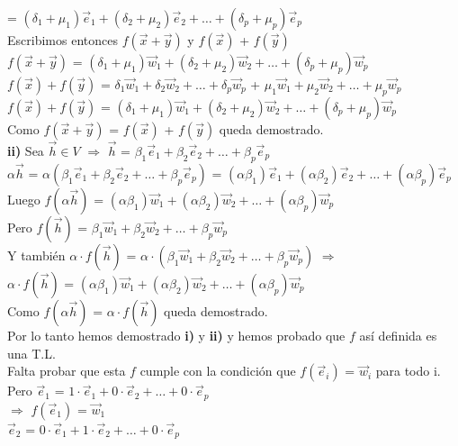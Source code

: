 \documentclass[11pt]{article}
\begin{document}
= $(\delta_1 + \mu_1)\vec{e}_1 + (\delta_2 + \mu_2) \vec{e}_2 + \hdots + (\delta_p + \mu_p) \vec{e}_p$\\
Escribimos entonces $f(\vec{x} + \vec{y})$ y $f(\vec{x})$ + $f(\vec{y})$\\
$f(\vec{x} + \vec{y})$ = $(\delta_1 + \mu_1)\vec{w}_1 + (\delta_2 + \mu_2) \vec{w}_2 + \hdots + (\delta_p + \mu_p) \vec{w}_p$ \\
$f(\vec{x}) + f(\vec{y})$ = $\delta_1\vec{w}_1 + \delta_2 \vec{w}_2 + \hdots + \delta_p \vec{w}_p$ + $\mu_1\vec{w}_1 + \mu_2 \vec{w}_2 + \hdots + \mu_p \vec{w}_p$\\
$f(\vec{x}) + f(\vec{y})$ = $(\delta_1 + \mu_1)\vec{w}_1 + (\delta_2 + \mu_2) \vec{w}_2 + \hdots + (\delta_p + \mu_p) \vec{w}_p$\\
Como $f(\vec{x} + \vec{y})$ = $f(\vec{x})$ + $f(\vec{y})$ queda demostrado.\\
{\bfseries ii)} Sea $\vec{h} \in V$ $\Rightarrow$ $\vec{h}$ = $\beta_1\vec{e}_1 + \beta_2 \vec{e}_2 + \hdots + \beta_p\vec{e}_p$ \\
$\alpha \vec{h}$ = $\alpha(\beta_1\vec{e}_1 + \beta_2 \vec{e}_2 + \hdots + \beta_p\vec{e}_p)$ = $(\alpha \beta_1)\vec{e}_1 + (\alpha \beta_2)\vec{e}_2 + \hdots + (\alpha \beta_p)\vec{e}_p$ \\
Luego $f(\alpha \vec{h})$ = $(\alpha \beta_1)\vec{w}_1 + (\alpha \beta_2)\vec{w}_2 + \hdots + (\alpha \beta_p)\vec{w}_p$ \\
Pero $f(\vec{h})$ = $\beta_1\vec{w}_1 + \beta_2 \vec{w}_2 + \hdots + \beta_p\vec{w}_p$\\
Y también $\alpha \cdot f(\vec{h})$ = $\alpha \cdot (\beta_1\vec{w}_1 + \beta_2 \vec{w}_2 + \hdots + \beta_p\vec{w}_p)$ $\Rightarrow$ \\
$\alpha \cdot f(\vec{h})$ = $(\alpha \beta_1)\vec{w}_1 + (\alpha \beta_2)\vec{w}_2 + \hdots + (\alpha \beta_p)\vec{w}_p$\\
Como  $f(\alpha \vec{h})$ = $\alpha \cdot f(\vec{h})$ queda demostrado. \\
Por lo tanto hemos demostrado {\bfseries i)} y {\bfseries ii)} y hemos probado que $f$ así definida es una T.L.\\
Falta probar que esta $f$ cumple con la condición que $f(\vec{e}_i)$ = $\vec{w}_i$ para todo i. \\
Pero $\vec{e}_1$ = $1 \cdot \vec{e}_1 + 0 \cdot \vec{e}_2 + \hdots + 0 \cdot \vec{e}_p$ \\
$\Rightarrow$ $f(\vec{e}_1)$ = $\vec{w}_1$ \\
$\vec{e}_2$ = $0 \cdot \vec{e}_1 + 1 \cdot \vec{e}_2 + \hdots + 0 \cdot \vec{e}_p$ \\
\end{document}
